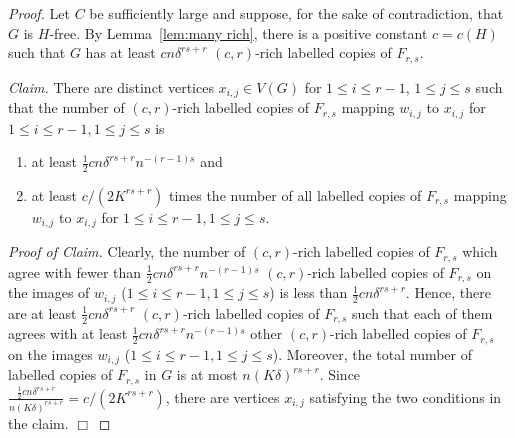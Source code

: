 \documentclass[11pt]{article}
\numberwithin{equation}{section}
\theoremstyle{definition}
\begin{document}
\begin{proof}
	Let $C$ be sufficiently large and suppose, for the sake of contradiction, that $G$ is $H$-free. By Lemma~\ref{lem:many rich}, there is a positive constant $c=c(H)$ such that $G$ has at least $cn\delta^{rs+r}$ $(c,r)$-rich labelled copies of $F_{r,s}$.
	
	\medskip
	
	\noindent \emph{Claim.} There are distinct vertices $x_{i,j}\in V(G)$ for $1\leq i\leq r-1$, $1\leq j\leq s$ such that the number of $(c,r)$-rich labelled copies of $F_{r,s}$ mapping $w_{i,j}$ to $x_{i,j}$ for $1\leq i\leq r-1,1\leq j\leq s$ is
	\begin{enumerate}
		\item at least $\frac{1}{2}cn\delta^{rs+r}n^{-(r-1)s}$ and \label{property:many ext}
		\item at least $c/(2K^{rs+r})$ times the number of all labelled copies of $F_{r,s}$ mapping $w_{i,j}$ to $x_{i,j}$ for $1\leq i\leq r-1,1\leq j\leq s$. \label{property:relatively many ext}
	\end{enumerate}
	
	\medskip
	
	\noindent \emph{Proof of Claim.} Clearly, the number of $(c,r)$-rich labelled copies of $F_{r,s}$ which agree with fewer than $\frac{1}{2}cn\delta^{rs+r}n^{-(r-1)s}$ $(c,r)$-rich labelled copies of $F_{r,s}$ on the images of $w_{i,j}$ ($1\leq i\leq r-1,1\leq j\leq s$) is less than $\frac{1}{2}cn\delta^{rs+r}$. Hence, there are at least $\frac{1}{2}cn\delta^{rs+r}$ $(c,r)$-rich labelled copies of $F_{r,s}$ such that each of them agrees with at least $\frac{1}{2}cn\delta^{rs+r}n^{-(r-1)s}$ other $(c,r)$-rich labelled copies of $F_{r,s}$ on the images $w_{i,j}$ ($1\leq i\leq r-1,1\leq j\leq s$). Moreover, the total number of labelled copies of $F_{r,s}$ in $G$ is at most $n(K\delta)^{rs+r}$. Since $\frac{\frac{1}{2}cn\delta^{rs+r}}{n(K\delta)^{rs+r}}=c/(2K^{rs+r})$, there are vertices $x_{i,j}$ satisfying the two conditions in the claim. \hfill $\Box$
	
	\medskip
	

\end{proof}
\end{document}
